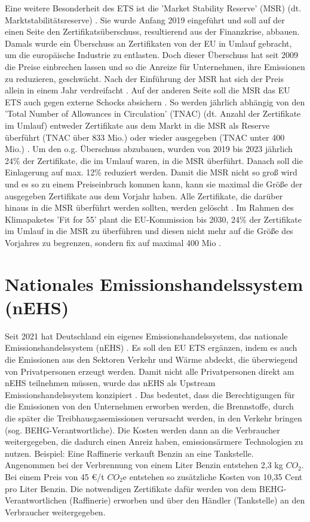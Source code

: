 Eine weitere Besonderheit des ETS ist die 'Market Stability Reserve' (MSR) (dt. Marktstabilitätsreserve) \cite{eu3.2023}. Sie wurde Anfang 2019 eingeführt und soll auf der einen Seite den Zertifikatsüberschuss, resultierend aus der Finanzkrise, abbauen.
Damals wurde ein Überschuss an Zertifikaten von der EU in Umlauf gebracht, um die europäische Industrie zu entlasten.
Doch dieser Überschuss hat seit 2009 die Preise einbrechen lassen und so die Anreize für Unternehmen, ihre Emissionen zu reduzieren, geschwächt. Nach der Einführung der MSR hat sich der Preis allein in einem Jahr verdreifacht .
Auf der anderen Seite soll die MSR das EU ETS auch gegen externe Schocks absichern \cite{eu3.2023}.
So werden jährlich abhängig von den 'Total Number of Allowances in Circulation' (TNAC) (dt. Anzahl der Zertifikate im Umlauf) entweder Zertifikate aus dem Markt in die MSR als Reserve überführt (TNAC über 833 Mio.) oder wieder ausgegeben (TNAC unter 400 Mio.) \cite[S. 7]{icap2.2023}.
Um den o.g. Überschuss abzubauen, wurden von 2019 bis 2023 jährlich 24\% der Zertifikate, die im Umlauf waren, in die MSR überführt.
Danach soll die Einlagerung auf max. 12\% reduziert werden. Damit die MSR nicht so groß wird und es so zu einem Preiseinbruch kommen kann, kann sie maximal die Größe der ausgegeben Zertifikate aus dem Vorjahr haben.
Alle Zertifikate, die darüber hinaus in die MSR überführt werden sollten, werden gelöscht \cite{eu3.2023}.
Im Rahmen des Klimapaketes 'Fit for 55' plant die EU-Kommission bis 2030, 24\% der Zertifikate im Umlauf in die MSR zu überführen und diesen nicht mehr auf die Größe des Vorjahres zu begrenzen, sondern fix auf maximal 400 Mio \cite{ub.2023}.

\section{Nationales Emissionshandelssystem (nEHS)}

Seit 2021 hat Deutschland ein eigenes Emissionshandelssystem, das nationale Emissionshandelssystem (nEHS) \cite{dehst.2023}. Es soll den EU ETS ergänzen, indem es auch die Emissionen aus den Sektoren Verkehr und Wärme abdeckt, die überwiegend von Privatpersonen erzeugt werden.
Damit nicht alle Privatpersonen direkt am nEHS teilnehmen müssen, wurde das nEHS als Upstream Emissionshandelssystem konzipiert \cite{dehst.2023}.
Das bedeutet, dass die Berechtigungen für die Emissionen von den Unternehmen erworben werden, die Brennstoffe, durch die später die Treibhausgasemissionen verursacht werden, in den Verkehr bringen (sog. BEHG-Verantwortliche).
Die Kosten werden dann an die Verbraucher weitergegeben, die dadurch einen Anreiz haben, emissionsärmere Technologien zu nutzen. Beispiel: Eine Raffinerie verkauft Benzin an eine Tankstelle.
Angenommen bei der Verbrennung von einem Liter Benzin entstehen 2,3 kg $CO_2$. Bei einem Preis von 45 €/t $CO_2$e entstehen so zusätzliche Kosten von 10,35 Cent pro Liter Benzin.
Die notwendigen Zertifikate dafür werden von dem BEHG-Verantwortlichen (Raffinerie) erworben und über den Händler (Tankstelle) an den Verbraucher weitergegeben.

